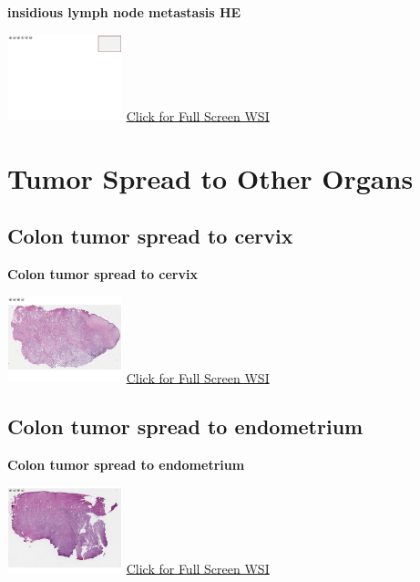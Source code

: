 \documentclass[
  letterpaper,
  paper=6in:9in,
  pagesize=pdftex,
  headinclude=on,
  footinclude=on,
  12pt]{scrbook}
\begin{document}
\textbf{insidious lymph node metastasis HE}

\href{https://images.patolojiatlasi.com/template/HE.html}{\includegraphics[width=0.25\textwidth,height=\textheight]{./screenshots/template_screenshot.png}}
\href{https://images.patolojiatlasi.com/insidious-lymph-node-metastasis/HE.html}{Click
for Full Screen WSI}

\hypertarget{sec-tumor-spread-to-other-organs}{%
\chapter{Tumor Spread to Other
Organs}\label{sec-tumor-spread-to-other-organs}}

\hypertarget{sec-colon-tumor-spread-to-cervix}{%
\section{Colon tumor spread to
cervix}\label{sec-colon-tumor-spread-to-cervix}}

\textbf{Colon tumor spread to cervix}

\href{https://images.patolojiatlasi.com/tumor-spread/HE-cervix.html}{\includegraphics[width=0.25\textwidth,height=\textheight]{./screenshots/tumor-spread-cervix_screenshot.png}}
\href{https://images.patolojiatlasi.com/tumor-spread/HE-cervix.html}{Click
for Full Screen WSI}

\hypertarget{sec-colon-tumor-spread-to-endometrium}{%
\section{Colon tumor spread to
endometrium}\label{sec-colon-tumor-spread-to-endometrium}}

\textbf{Colon tumor spread to endometrium}

\href{https://images.patolojiatlasi.com/tumor-spread/HE-endometrium.html}{\includegraphics[width=0.25\textwidth,height=\textheight]{./screenshots/tumor-spread-endometrium_screenshot.png}}
\href{https://images.patolojiatlasi.com/tumor-spread/HE-endometrium.html}{Click
for Full Screen WSI}
\end{document}

